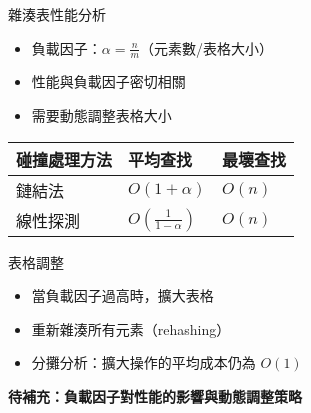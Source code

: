 \documentclass{beamer}
\begin{document}
\begin{frame}{雜湊表性能分析}
\begin{itemize}
    \item 負載因子：$\alpha = \frac{n}{m}$（元素數/表格大小）
    \item 性能與負載因子密切相關
    \item 需要動態調整表格大小
\end{itemize}

\vspace{1em}
\begin{center}
\renewcommand{\arraystretch}{1.3}
\begin{tabular}{|>{\centering\arraybackslash}m{3cm}|>{\centering\arraybackslash}m{2cm}|>{\centering\arraybackslash}m{2cm}|}
\hline
\textbf{碰撞處理方法} & \textbf{平均查找} & \textbf{最壞查找} \\
\hline
鏈結法 & $O(1 + \alpha)$ & $O(n)$ \\
\hline
線性探測 & $O\left(\frac{1}{1-\alpha}\right)$ & $O(n)$ \\
\hline
\end{tabular}
\end{center}

\vspace{1em}
\begin{block}{表格調整}
\begin{itemize}
    \item 當負載因子過高時，擴大表格
    \item 重新雜湊所有元素（rehashing）
    \item 分攤分析：擴大操作的平均成本仍為 $O(1)$
\end{itemize}
\end{block}

\vspace{1em}
\textbf{待補充：負載因子對性能的影響與動態調整策略}
\end{frame}
\end{document}
